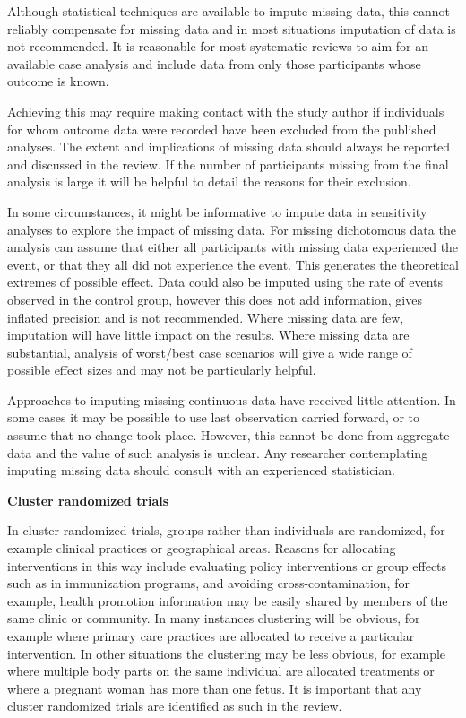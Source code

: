 \documentclass[
  10pt,
  a4paper,
  DIV=11,
  numbers=noendperiod]{scrreprt}
\begin{document}
Although statistical techniques are available to impute missing data,
this cannot reliably compensate for missing data and in most situations
imputation of data is not recommended. It is reasonable for most
systematic reviews to aim for an available case analysis and include
data from only those participants whose outcome is known.

Achieving this may require making contact with the study author if
individuals for whom outcome data were recorded have been excluded from
the published analyses. The extent and implications of missing data
should always be reported and discussed in the review. If the number of
participants missing from the final analysis is large it will be helpful
to detail the reasons for their exclusion.

In some circumstances, it might be informative to impute data in
sensitivity analyses to explore the impact of missing data. For missing
dichotomous data the analysis can assume that either all participants
with missing data experienced the event, or that they all did not
experience the event. This generates the theoretical extremes of
possible effect. Data could also be imputed using the rate of events
observed in the control group, however this does not add information,
gives inflated precision and is not recommended. Where missing data are
few, imputation will have little impact on the results. Where missing
data are substantial, analysis of worst/best case scenarios will give a
wide range of possible effect sizes and may not be particularly helpful.

Approaches to imputing missing continuous data have received little
attention. In some cases it may be possible to use last observation
carried forward, or to assume that no change took place. However, this
cannot be done from aggregate data and the value of such analysis is
unclear. Any researcher contemplating imputing missing data should
consult with an experienced statistician.

\textbf{Cluster randomized trials}

In cluster randomized trials, groups rather than individuals are
randomized, for example clinical practices or geographical areas.
Reasons for allocating interventions in this way include evaluating
policy interventions or group effects such as in immunization programs,
and avoiding cross-contamination, for example, health promotion
information may be easily shared by members of the same clinic or
community. In many instances clustering will be obvious, for example
where primary care practices are allocated to receive a particular
intervention. In other situations the clustering may be less obvious,
for example where multiple body parts on the same individual are
allocated treatments or where a pregnant woman has more than one fetus.
It is important that any cluster randomized trials are identified as
such in the review.
\end{document}
